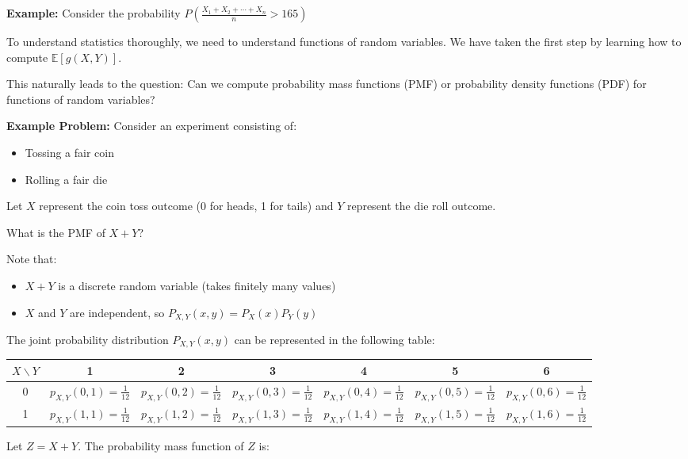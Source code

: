 \documentclass{article}
\begin{document}
    \textbf{Example:} Consider the probability $P\left(\frac{X_1 + X_2 + \cdots + X_n}{n} > 165\right)$
    
    To understand statistics thoroughly, we need to understand functions of random variables.
    We have taken the first step by learning how to compute $\mathbb{E}[g(X,Y)]$.
    
    This naturally leads to the question: Can we compute probability mass functions (PMF) or 
    probability density functions (PDF) for functions of random variables?
    
    \textbf{Example Problem:} Consider an experiment consisting of:
    \begin{itemize}
        \item Tossing a fair coin
        \item Rolling a fair die
    \end{itemize}
    
    Let $X$ represent the coin toss outcome (0 for heads, 1 for tails) and $Y$ represent the die roll outcome.
    
    What is the PMF of $X + Y$?
    
    Note that:
    \begin{itemize}
        \item $X + Y$ is a discrete random variable (takes finitely many values)
        \item $X$ and $Y$ are independent, so $P_{X,Y}(x,y) = P_X(x)P_Y(y)$
    \end{itemize}
    
    The joint probability distribution $P_{X,Y}(x,y)$ can be represented in the following table:
  

    \begin{center}
        \begin{tabular}{c|cccccc}
            $X \backslash Y$ & 1 & 2 & 3 & 4 & 5 & 6 \\ \hline
            0 & $p_{X,Y}(0,1)=\frac{1}{12}$ & $p_{X,Y}(0,2)=\frac{1}{12}$ & $p_{X,Y}(0,3)=\frac{1}{12}$ & $p_{X,Y}(0,4)=\frac{1}{12}$ & $p_{X,Y}(0,5)=\frac{1}{12}$ & $p_{X,Y}(0,6)=\frac{1}{12}$ \\
            1 & $p_{X,Y}(1,1)=\frac{1}{12}$ & $p_{X,Y}(1,2)=\frac{1}{12}$ & $p_{X,Y}(1,3)=\frac{1}{12}$ & $p_{X,Y}(1,4)=\frac{1}{12}$ & $p_{X,Y}(1,5)=\frac{1}{12}$ & $p_{X,Y}(1,6)=\frac{1}{12}$ \\
        \end{tabular}
    \end{center}
    Let $Z = X + Y$. The probability mass function of $Z$ is:
\end{document}
